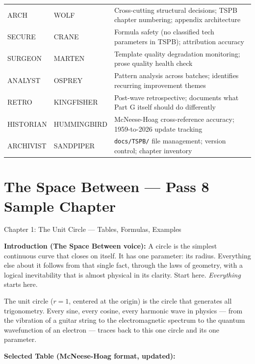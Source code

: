 \documentclass[11pt,letterpaper]{article}
\begin{document}
\begin{center}
\begin{tabularx}{\textwidth}{L{2.5cm}L{3cm}X}
ARCH & WOLF & Cross-cutting structural decisions; TSPB chapter numbering; appendix architecture \\
SECURE & CRANE & Formula safety (no classified tech parameters in TSPB); attribution accuracy \\
SURGEON & MARTEN & Template quality degradation monitoring; prose quality health check \\
ANALYST & OSPREY & Pattern analysis across batches; identifies recurring improvement themes \\
RETRO & KINGFISHER & Post-wave retrospective; documents what Part G itself should do differently \\
HISTORIAN & HUMMINGBIRD & McNeese-Hoag cross-reference accuracy; 1959-to-2026 update tracking \\
ARCHIVIST & SANDPIPER & \texttt{docs/TSPB/} file management; version control; chapter inventory \\
\bottomrule
\end{tabularx}
\end{center}

\section{The Space Between --- Pass 8 Sample Chapter}

\begin{tspbbox}{Chapter 1: The Unit Circle --- Tables, Formulas, Examples}

\textbf{Introduction (The Space Between voice):}
A circle is the simplest continuous curve that closes on itself. It has one parameter: its radius. Everything else about it follows from that single fact, through the laws of geometry, with a logical inevitability that is almost physical in its clarity. Start here. \textit{Everything} starts here.

The unit circle ($r = 1$, centered at the origin) is the circle that generates all trigonometry. Every sine, every cosine, every harmonic wave in physics --- from the vibration of a guitar string to the electromagnetic spectrum to the quantum wavefunction of an electron --- traces back to this one circle and its one parameter.

\textbf{Selected Table (McNeese-Hoag format, updated):}
\end{tspbbox}
\end{document}
